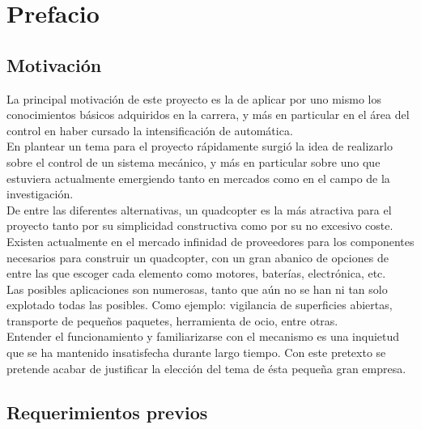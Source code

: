 \documentclass[twoside]{article}
\begin{document}
\newpage
\begin{center}

\end{center}
\thispagestyle{empty}
\newpage

\setcounter{page}{1}
\tableofcontents
{}
\fancyfoot[C]{}
\newpage
\fancyhead[LE,RO]{\thepage}
\setcounter{page}{4}
\listoffigures
\newpage

\section{Prefacio} \label{prefacio}
\subsection{Motivación}

La principal motivación de este proyecto es la de aplicar por uno mismo los conocimientos básicos adquiridos en la carrera, y más en particular en el área del control en haber cursado la intensificación de automática.\\

En plantear un tema para el proyecto rápidamente surgió la idea de realizarlo sobre el control de un sistema mecánico, y más en particular sobre uno que estuviera actualmente emergiendo tanto en mercados como en el campo de la investigación.\\ 

De entre las diferentes alternativas, un quadcopter es la más atractiva para el proyecto tanto por su simplicidad constructiva como por su no excesivo coste. Existen actualmente en el mercado infinidad de proveedores para los componentes necesarios para construir un quadcopter, con un gran abanico de opciones de entre las que escoger cada elemento como motores, baterías, electrónica, etc.\\

Las posibles aplicaciones son numerosas, tanto que aún no se han ni tan solo explotado todas las posibles. Como ejemplo: vigilancia de superficies abiertas, transporte de pequeños paquetes, herramienta de ocio, entre otras.\\

Entender el funcionamiento y familiarizarse con el mecanismo es una inquietud que se ha mantenido insatisfecha durante largo tiempo. Con este pretexto se pretende acabar de justificar la elección del tema de ésta pequeña gran empresa.

\subsection{Requerimientos previos}
\end{document}
